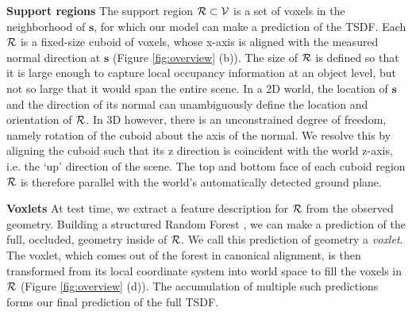 \documentclass[10pt,twocolumn,letterpaper]{article}
\makeatletter
\renewcommand*{\ie}{i.e.\@\xspace}
\newcommand{\pixelidx}{\mathbf{s}}
\newcommand{\voxelgrid}{\mathcal{V}}
\newcommand{\project}{\mathbf{p}}
\newcommand{\todo}[1]{\textcolor{red}{TODO: #1}}
\renewcommand{\paragraph}{\vspace{2pt}\noindent\textbf}
\makeatother
\begin{document}



\paragraph{Support regions}\newline
The support region $\voxregion \subset \voxelgrid$ is a set of voxels in the neighborhood of $\pixelidx$, for which our model can make a prediction of the TSDF.
Each $\mathcal{R}$ is a fixed-size cuboid of voxels, whose x-axis is aligned with the measured normal direction %
at $\pixelidx$ (Figure \ref{fig:overview} (b)).
The size of $\mathcal{R}$ is defined so that it is large enough to capture local occupancy information at an object level, but not so large that it would span the entire scene.
In a 2D world, the location of $\pixelidx$ and the direction of its normal can unambiguously define the location and orientation of $\mathcal{R}$.
In 3D however, there is an unconstrained degree of freedom, namely rotation of the cuboid about the axis of the normal.
We resolve this by aligning the cuboid such that its z direction is coincident with the world z-axis, \ie the `up' direction of the scene.
The top and bottom face of each cuboid region $\mathcal{R}$ is therefore parallel with the world's automatically detected ground plane.


\paragraph{Voxlets}\newline
At test time, we extract a feature description for $\mathcal{R}$ from the observed geometry.
Building a structured Random Forest \cite{dollar-iccv-2013}, we can make a prediction of the full, occluded, geometry inside of $\mathcal{R}$.
We call this prediction of geometry a \emph{voxlet}.
The voxlet, which comes out of the forest in canonical alignment, is then transformed from its local coordinate system into world space to fill the voxels in $\mathcal{R}$ (Figure \ref{fig:overview} (d)).
The accumulation of multiple such predictions forms our final prediction of the full TSDF.
\end{document}
